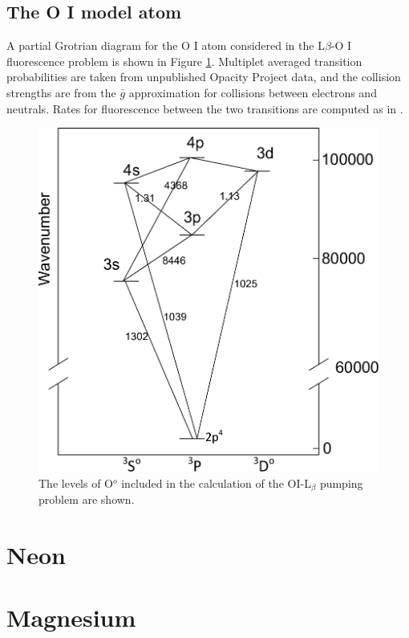 \subsection{The O I model atom}

A partial Grotrian diagram for the O I atom considered in the L$\beta$-O I
fluorescence problem is shown in Figure \ref{fig:OI_EnergyLevels}.  Multiplet averaged transition
probabilities are taken from unpublished Opacity Project data, and the
collision strengths are from the $\bar g$
 approximation for collisions between electrons and neutrals.  Rates
for fluorescence between the two transitions are computed as in
\citet{Netzer1985}.

\begin{figure}
\centering
\includegraphics[scale=0.8]{OI_EnergyLevels}
\caption[O~I energy levels]{The levels of O$^o$ included in the calculation of the
OI-L$_{\beta}$ pumping
problem are shown.}
\label{fig:OI_EnergyLevels}
\end{figure}

\section{Neon}


\section{Magnesium}

